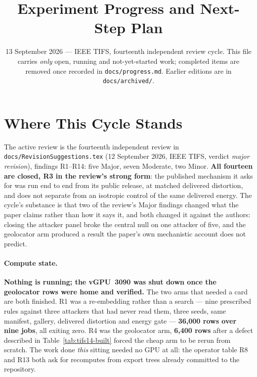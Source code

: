 \documentclass[11pt]{article}
\title{\textbf{Experiment Progress and Next-Step Plan}}
\author{}
\date{13 September 2026 --- IEEE TIFS, fourteenth independent review cycle.
This file carries \emph{only} open, running and not-yet-started work;
completed items are removed once recorded in \texttt{docs/progress.md}.
Earlier editions are in \texttt{docs/archived/}.}
\begin{document}
\maketitle

\section*{Where This Cycle Stands}

The active review is the fourteenth independent review in
\texttt{docs/RevisionSuggestions.tex} (12 September 2026, IEEE TIFS, verdict
\emph{major revision}), findings R1--R14: five Major, seven Moderate, two
Minor. \textbf{All fourteen are closed, R3 in the review's strong form}: the
published mechanism it asks for was run end to end from its public release,
at matched delivered distortion, and does not separate from an isotropic
control of the same delivered energy. The cycle's substance is that two
of the review's Major findings changed what the paper claims rather than how
it says it, and both changed it against the authors: closing the attacker
panel broke the central null on one attacker of five, and the geolocator arm
produced a result the paper's own mechanistic account does not predict.

\paragraph{Compute state.} \textbf{Nothing is running; the vGPU~3090 was shut
down once the geolocator rows were home and verified.} The two arms that
needed a card are both finished. R1 was a re-embedding rather than a search
--- nine prescribed rules against three attackers that had never read them,
three seeds, same manifest, gallery, delivered distortion and energy gate ---
\textbf{36{,}000 rows over nine jobs}, all exiting zero. R4 was the geolocator
arm, \textbf{6{,}400 rows} after a defect described in Table~\ref{tab:tifs14-built}
forced the cheap arm to be rerun from scratch. The work done \emph{this}
sitting needed no GPU at all: the operator table R8 and R13 both ask for
recomputes from export trees already committed to the repository.
\end{document}
